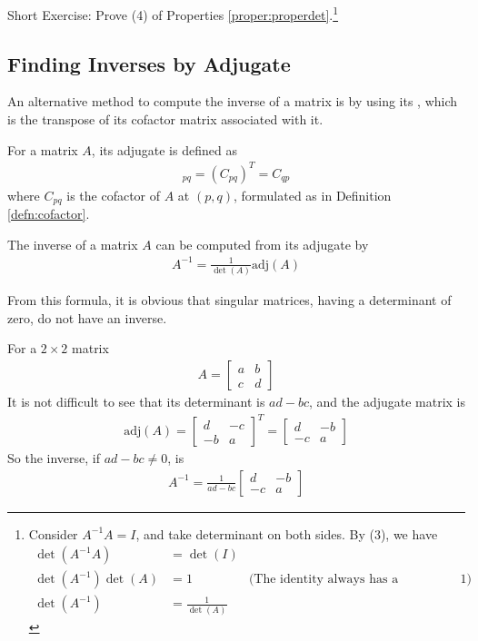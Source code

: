 Short Exercise: Prove (4) of Properties \ref{proper:properdet}.\footnote{Consider $A^{-1}A=I$, and take determinant on both sides. By (3), we have
\begin{align*}
\det(A^{-1}A) &= \det(I) \\
\det(A^{-1})\det(A) &= 1 & \text{(The identity always has a determinant of $1$)} \\
\det(A^{-1}) &= \frac{1}{\det(A)}
\end{align*}}

\subsection{Finding Inverses by Adjugate}
An alternative method to compute the inverse of a matrix is by using its , which is the transpose of its cofactor matrix associated with it.
\begin{defn}[Adjugate]
For a matrix $A$, its adjugate is defined as
\begin{align}
[\text{adj}(A)]_{pq} = (C_{pq})^T = C_{qp}
\end{align}
where $C_{pq}$ is the cofactor of $A$ at $(p, q)$, formulated as in Definition \ref{defn:cofactor}.
\end{defn}
\begin{proper}
\label{proper:invadj}
The inverse of a matrix $A$ can be computed from its adjugate by
\begin{align}
A^{-1} = \frac{1}{\det(A)}\text{adj}(A)
\end{align}
\end{proper}
From this formula, it is obvious that singular matrices, having a determinant of zero, do not have an inverse.
\begin{exmp}
\label{exmp:2x2}
For a $2 \times 2$ matrix
\begin{align*}
A = \begin{bmatrix}
a & b \\
c & d
\end{bmatrix}    
\end{align*}
It is not difficult to see that its determinant is $ad - bc$, and the adjugate matrix is
\begin{align*}
\text{adj}(A) = 
\begin{bmatrix}
d & -c \\
-b & a 
\end{bmatrix}^T = 
\begin{bmatrix}
d & -b \\
-c & a 
\end{bmatrix}    
\end{align*}
So the inverse, if $ad - bc \neq 0$, is
\begin{align}
A^{-1} = 
\frac{1}{ad-bc}
\begin{bmatrix}
d & -b \\
-c & a 
\end{bmatrix}
\label{eqn:2times2inv}
\end{align}
\end{exmp}

